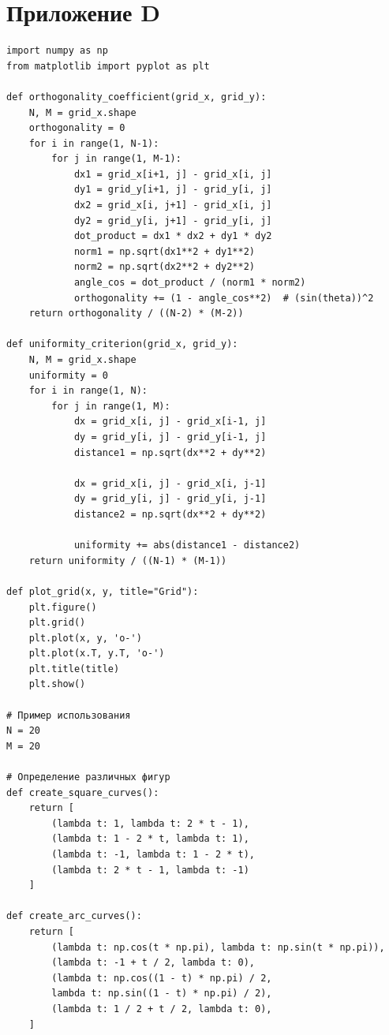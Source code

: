 \documentclass[a4paper,14pt,russian]{extreport}
\renewcommand{\_}{\kern-1.5pt\textunderscore\kern-1.5pt}
\begin{document}
\section{Приложение D}
\begin{verbatim}
import numpy as np
from matplotlib import pyplot as plt

def orthogonality_coefficient(grid_x, grid_y):
    N, M = grid_x.shape
    orthogonality = 0
    for i in range(1, N-1):
        for j in range(1, M-1):
            dx1 = grid_x[i+1, j] - grid_x[i, j]
            dy1 = grid_y[i+1, j] - grid_y[i, j]
            dx2 = grid_x[i, j+1] - grid_x[i, j]
            dy2 = grid_y[i, j+1] - grid_y[i, j]
            dot_product = dx1 * dx2 + dy1 * dy2
            norm1 = np.sqrt(dx1**2 + dy1**2)
            norm2 = np.sqrt(dx2**2 + dy2**2)
            angle_cos = dot_product / (norm1 * norm2)
            orthogonality += (1 - angle_cos**2)  # (sin(theta))^2
    return orthogonality / ((N-2) * (M-2))

def uniformity_criterion(grid_x, grid_y):
    N, M = grid_x.shape
    uniformity = 0
    for i in range(1, N):
        for j in range(1, M):
            dx = grid_x[i, j] - grid_x[i-1, j]
            dy = grid_y[i, j] - grid_y[i-1, j]
            distance1 = np.sqrt(dx**2 + dy**2)
            
            dx = grid_x[i, j] - grid_x[i, j-1]
            dy = grid_y[i, j] - grid_y[i, j-1]
            distance2 = np.sqrt(dx**2 + dy**2)
            
            uniformity += abs(distance1 - distance2)
    return uniformity / ((N-1) * (M-1))

def plot_grid(x, y, title="Grid"):
    plt.figure()
    plt.grid()
    plt.plot(x, y, 'o-')
    plt.plot(x.T, y.T, 'o-')
    plt.title(title)
    plt.show()

# Пример использования
N = 20
M = 20

# Определение различных фигур
def create_square_curves():
    return [
        (lambda t: 1, lambda t: 2 * t - 1),
        (lambda t: 1 - 2 * t, lambda t: 1),
        (lambda t: -1, lambda t: 1 - 2 * t),
        (lambda t: 2 * t - 1, lambda t: -1)
    ]

def create_arc_curves():
    return [
        (lambda t: np.cos(t * np.pi), lambda t: np.sin(t * np.pi)),
        (lambda t: -1 + t / 2, lambda t: 0),
        (lambda t: np.cos((1 - t) * np.pi) / 2,
        lambda t: np.sin((1 - t) * np.pi) / 2),
        (lambda t: 1 / 2 + t / 2, lambda t: 0),
    ]


\end{verbatim}
\end{document}
